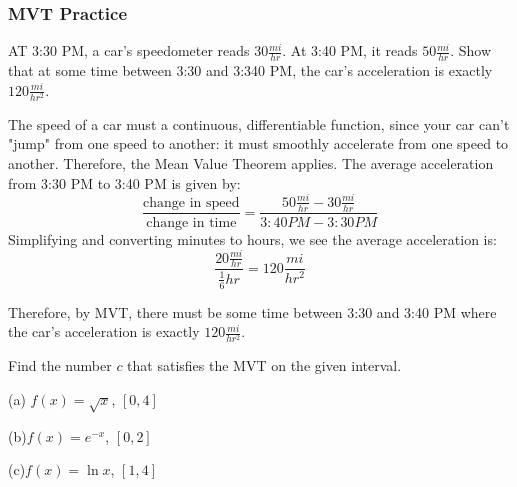 \subsubsection{MVT Practice}
\begin{Exercise}
[label=MVT1]
AT 3:30 PM, a car's speedometer reads $30 \frac{mi}{hr}$. At 3:40 PM, it reads 
$50\frac{mi}{hr}$. Show that at some time between 3:30 and 3:340 PM, the car's 
acceleration is exactly $120 \frac{mi}{hr^2}$. 
\end{Exercise}
\begin{Answer}
[ref=MVT1]
The speed of a car must a continuous, differentiable function, since your car 
can't "jump" from one speed to another: it must smoothly accelerate from one 
speed to another. Therefore, the Mean Value Theorem applies. The average 
acceleration from 3:30 PM to 3:40 PM is given by:
$$\frac{\text{change in speed}}{\text{change in time}} = \frac{50 \frac{mi}{hr}
 - 30\frac{mi}{hr}}{3:40PM - 3:30PM}$$ 
Simplifying and converting minutes to hours, we see the average acceleration is:
$$\frac{20\frac{mi}{hr}}{\frac{1}{6}hr} = 120\frac{mi}{hr^2}$$

Therefore, by MVT, there must be some time between 3:30 and 3:40 PM where the 
car's acceleration is exactly $120 \frac{mi}{hr^2}$. 
\end{Answer}

\begin{Exercise}
[label=MVT2]
Find the number $c$ that satisfies the MVT on the given interval. 

(a) $f(x) = \sqrt{x}$, $[0, 4]$

(b)$f(x) = e^{-x}$, $[0,2]$

(c)$f(x) = \ln{x}$, $[1,4]$	
\end{Exercise}

